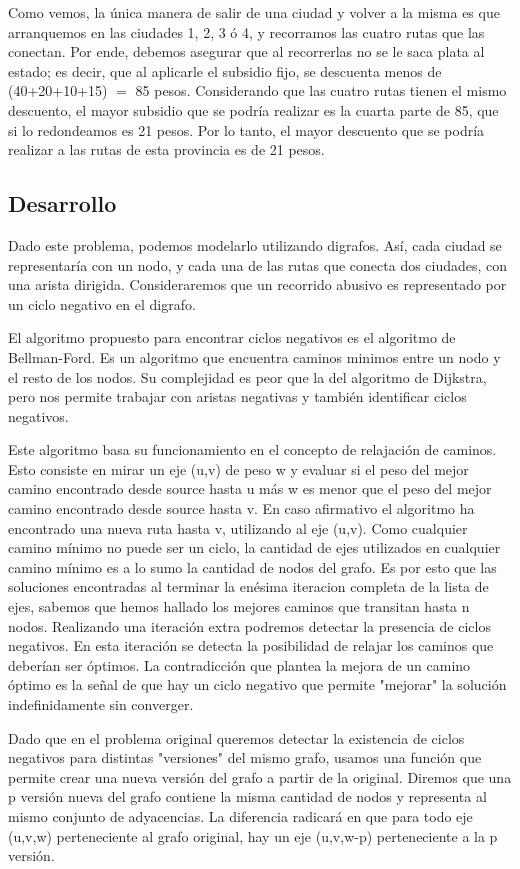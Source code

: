 Como vemos, la única manera de salir de una ciudad y volver a la misma es que arranquemos en las ciudades 1, 2, 3 ó 4, y recorramos las cuatro rutas que las conectan. Por ende, debemos asegurar que al recorrerlas no se le saca plata al estado; es decir, que al aplicarle el subsidio fijo, se descuenta menos de (40+20+10+15) $=$ 85 pesos. Considerando que las cuatro rutas tienen el mismo descuento, el mayor subsidio que se podría realizar es la cuarta parte de 85, que si lo redondeamos es 21 pesos. Por lo tanto, el mayor descuento que se podría realizar a las rutas de esta provincia es de 21 pesos.
\\
\par
\subsection{Desarrollo}
Dado este problema, podemos modelarlo utilizando digrafos. Así, cada ciudad se representaría con un nodo, y cada una de las rutas que conecta dos ciudades, con una arista dirigida. Consideraremos que un recorrido abusivo es representado por un ciclo negativo en el digrafo.
\\
\par
El algoritmo propuesto para encontrar ciclos negativos es el algoritmo de Bellman-Ford. Es un algoritmo que encuentra caminos minimos entre un nodo y el resto de los nodos. Su complejidad es peor que la del algoritmo de Dijkstra, pero nos permite trabajar con aristas negativas y también identificar ciclos negativos. 
\\
\par
Este algoritmo basa su funcionamiento en el concepto de relajación de caminos. Esto consiste en mirar un eje (u,v) de peso w y evaluar si el peso del mejor camino encontrado desde source hasta u más w es menor que el peso del mejor camino encontrado desde source hasta v. En caso afirmativo el algoritmo ha encontrado una nueva ruta hasta v, utilizando al eje (u,v). Como cualquier camino mínimo no puede ser un ciclo, la cantidad de ejes utilizados en cualquier camino mínimo es a lo sumo la cantidad de nodos del grafo. Es por esto que las soluciones encontradas al terminar la enésima iteracion completa de la lista de ejes, sabemos que hemos hallado los mejores caminos que transitan hasta n nodos. Realizando una iteración extra podremos detectar la presencia de ciclos negativos. En esta iteración se detecta la posibilidad de relajar los caminos que deberían ser óptimos. La contradicción que plantea la mejora de un camino óptimo es la señal de que hay un ciclo negativo que permite "mejorar" la solución indefinidamente sin converger.
\\
\par
Dado que en el problema original queremos detectar la existencia de ciclos negativos para distintas "versiones" del mismo grafo, usamos una función que permite crear una nueva versión del grafo a partir de la original. Diremos que una p versión nueva del grafo contiene la misma cantidad de nodos y representa al mismo conjunto de adyacencias. La diferencia radicará en que para todo eje (u,v,w) perteneciente al grafo original, hay un eje (u,v,w-p) perteneciente a la p versión.

